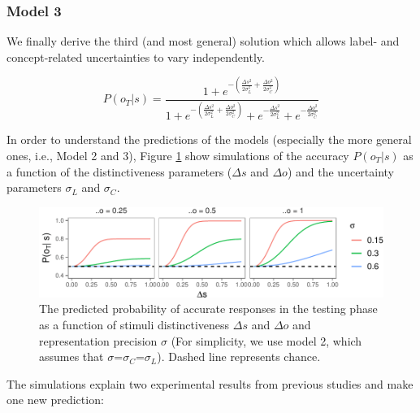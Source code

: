 \documentclass[english,,man,floatsintext]{apa6}
\theoremstyle{definition}
\theoremstyle{definition}
\theoremstyle{definition}
\theoremstyle{remark}
\begin{document}
\subsubsection{Model 3}\label{model-3}

We finally derive the third (and most general) solution which allows
label- and concept-related uncertainties to vary independently.

\begin{equation} \label{eq:model3}
P(o_T|s)= \frac{1 + e^{- (\frac{\Delta s^2}{2\sigma_L^2}+ \frac{\Delta o^2}{2\sigma_C^2})}}{1 + e^{-(\frac{\Delta s^2}{2\sigma_L^2}+ \frac{\Delta o^2}{2\sigma_C^2})}+ e^{-\frac{\Delta s^2}{2\sigma_L^2}} + e^{-\frac{\Delta o^2}{2\sigma_C^2}}}
\end{equation}

In order to understand the predictions of the models (especially the
more general ones, i.e., Model 2 and 3), Figure \ref{fig:simulation}
show simulations of the accuracy \(P(o_T|s)\) as a function of the
distinctiveness parameters (\(\Delta s\) and \(\Delta o\)) and the
uncertainty parameters \(\sigma_L\) and \(\sigma_C\).

\begin{figure}[htbp]
\centering
\includegraphics{ms_files/figure-latex/simulation-1.pdf}
\caption{\label{fig:simulation}The predicted probability of accurate
responses in the testing phase as a function of stimuli distinctiveness
\(\Delta s\) and \(\Delta o\) and representation precision \(\sigma\)
(For simplicity, we use model 2, which assumes that
\(\sigma\)=\(\sigma_C\)=\(\sigma_L\)). Dashed line represents chance.}
\end{figure}

The simulations explain two experimental results from previous studies
and make one new prediction:
\end{document}
